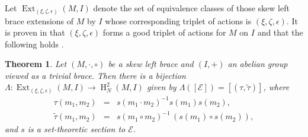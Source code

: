 \documentclass[11pt]{amsart}
\theoremstyle{thrm}
\theoremstyle{plain}
\newtheorem{thm}{Theorem}[section]
\theoremstyle{definition}
\newcommand{\Ho}{\operatorname{H} }
\newcommand{\Ext}{\operatorname{Ext} }
\numberwithin{equation}{section}
\begin{document}
Let $\Ext_{(\xi, \zeta, \epsilon)}(M, I)$ denote the set of equivalence classes of those skew left brace extensions of $M$ by $I$ whose corresponding triplet of actions is $(\xi, \zeta, \epsilon)$. It is proven in \cite[Proposition 3.4]{NMY1} that $(\xi, \zeta, \epsilon)$ forms a good triplet of actions for $M$ on $I$ and that the following holds \cite[Theorem A]{NMY1}.

\begin{thm}\label{gbij-thm sb}
	Let $(M, \cdot, \circ)$ be a skew left brace and $(I, +)$ an abelian group viewed as a trivial brace. Then there is a bijection $\Lambda:\Ext_{(\xi, \zeta, \epsilon)}(M, I) \rightarrow \Ho^2_N(M, I)$ given by $\Lambda([\mathcal{E}])=[(\tau, \tilde{\tau})]$, where 
	\begin{eqnarray*}
		\tau(m_1, m_2) &= &  s(m_1 \cdot m_2)^{-1}  s(m_1)  s(m_2),\\
		\tilde{\tau}(m_1, m_2) &=& s(m_1 \circ m_2)^{-1}  \,(s(m_1) \circ  s(m_2)),
	\end{eqnarray*}
	and $s$ is a set-theoretic section to $\mathcal{E}$.
\end{thm}
\end{document}
